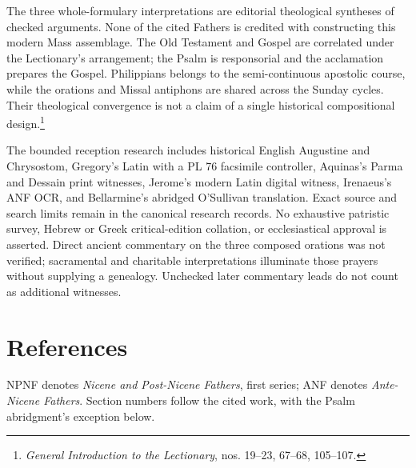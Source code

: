 The three whole-formulary interpretations are editorial theological syntheses of checked arguments. None of the cited Fathers is credited with constructing this modern Mass assemblage. The Old Testament and Gospel are correlated under the Lectionary's arrangement; the Psalm is responsorial and the acclamation prepares the Gospel. Philippians belongs to the semi-continuous apostolic course, while the orations and Missal antiphons are shared across the Sunday cycles. Their theological convergence is not a claim of a single historical compositional design.\footnote{\textit{General Introduction to the Lectionary}, nos. 19--23, 67--68, 105--107.}

The bounded reception research includes historical English Augustine and Chrysostom, Gregory's Latin with a PL 76 facsimile controller, Aquinas's Parma and Dessain print witnesses, Jerome's modern Latin digital witness, Irenaeus's ANF OCR, and Bellarmine's abridged O'Sullivan translation. Exact source and search limits remain in the canonical research records. No exhaustive patristic survey, Hebrew or Greek critical-edition collation, or ecclesiastical approval is asserted. Direct ancient commentary on the three composed orations was not verified; sacramental and charitable interpretations illuminate those prayers without supplying a genealogy. Unchecked later commentary leads do not count as additional witnesses.

\section*{References}
NPNF denotes \textit{Nicene and Post-Nicene Fathers}, first series; ANF denotes \textit{Ante-Nicene Fathers}. Section numbers follow the cited work, with the Psalm abridgment's exception below.


